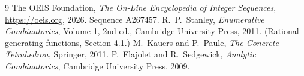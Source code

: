 \documentclass[11pt,a4paper]{article}
\theoremstyle{plain}
\theoremstyle{definition}
\begin{document}
\begin{thebibliography}{9}
 The OEIS Foundation, \emph{The On-Line Encyclopedia of Integer
Sequences}, \url{https://oeis.org}, 2026. Sequence A267457.
 R.~P.~Stanley, \emph{Enumerative Combinatorics}, Volume 1, 2nd ed.,
Cambridge University Press, 2011. (Rational generating functions, Section 4.1.)
 M.~Kauers and P.~Paule, \emph{The Concrete Tetrahedron}, Springer, 2011.
 P.~Flajolet and R.~Sedgewick, \emph{Analytic Combinatorics}, Cambridge
University Press, 2009.
\end{thebibliography}
\end{document}
